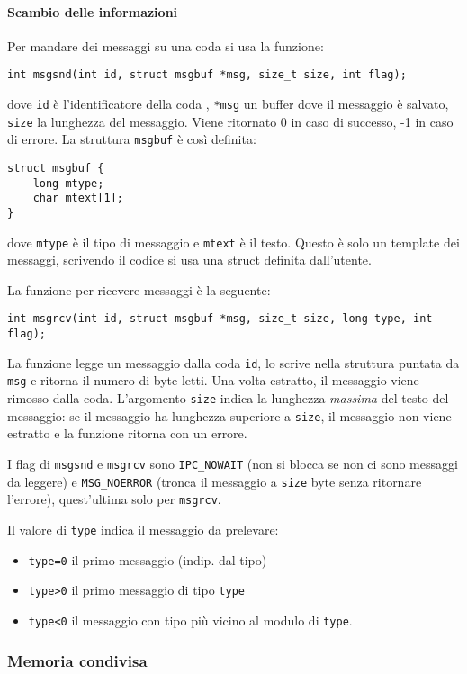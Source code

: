 \documentclass[a4paper, 10pt]{article}
\begin{document}
\paragraph{Scambio delle informazioni}
Per mandare dei messaggi su una coda si usa la funzione:
\begin{verbatim}
int msgsnd(int id, struct msgbuf *msg, size_t size, int flag);
\end{verbatim}
dove \verb|id| è l'identificatore della coda , \verb|*msg| un buffer dove il messaggio è salvato, \verb|size| la lunghezza del messaggio. Viene ritornato 0 in caso di successo, -1 in caso di errore.
La struttura \verb|msgbuf| è così definita:
\begin{verbatim}
struct msgbuf {
    long mtype;
    char mtext[1];
}
\end{verbatim}
dove \verb|mtype| è il tipo di messaggio e \verb|mtext| è il testo.
Questo è solo un template dei messaggi, scrivendo il codice si usa una struct definita dall'utente.

La funzione per ricevere messaggi è la seguente:
\begin{verbatim}
int msgrcv(int id, struct msgbuf *msg, size_t size, long type, int flag);
\end{verbatim}
La funzione legge un messaggio dalla coda \verb|id|, lo scrive nella struttura puntata da \verb|msg| e ritorna il numero di byte letti. Una volta estratto, il messaggio viene rimosso dalla coda.
L'argomento \verb|size| indica la lunghezza \textit{massima} del testo del messaggio: se il messaggio ha lunghezza superiore a \verb|size|, il messaggio non viene estratto e la funzione ritorna con un errore.

I flag di \verb|msgsnd| e \verb|msgrcv| sono \verb|IPC_NOWAIT| (non si blocca se non ci sono messaggi da leggere) e \verb|MSG_NOERROR| (tronca il messaggio a \verb|size| byte senza ritornare l'errore), quest'ultima solo per \verb|msgrcv|.

Il valore di \verb|type| indica il messaggio da prelevare:
\begin{itemize}
\item \verb|type=0| il primo messaggio (indip. dal tipo)
\item \verb|type>0| il primo messaggio di tipo \verb|type|
\item \verb|type<0| il messaggio con tipo più vicino al modulo di \verb|type|.
\end{itemize}
\newpage

\subsubsection{Memoria condivisa}
\end{document}
